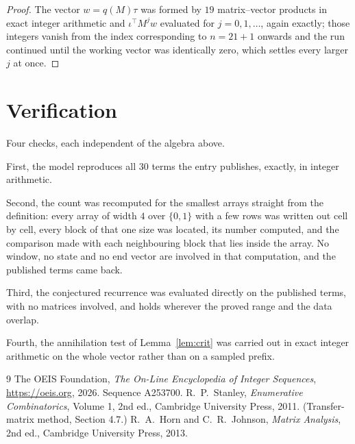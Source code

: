 \documentclass[11pt,a4paper]{article}
\theoremstyle{plain}
\theoremstyle{definition}
\begin{document}
\begin{proof}
The vector $w=q(M)\tau$ was formed by $19$ matrix--vector products in exact integer
arithmetic and $\iota^{\!\top}M^{j}w$ evaluated for $j=0,1,\dots$, again exactly; those
integers vanish from the index corresponding to $n=21+1$ onwards and the run continued
until the working vector was identically zero, which settles every larger $j$ at once.
\end{proof}

\section{Verification}

Four checks, each independent of the algebra above.

First, the model reproduces all $30$ terms the entry publishes, exactly, in integer
arithmetic.

Second, the count was recomputed for the smallest arrays straight from the definition: every
array of width $4$ over $\{0,1\}$ with a few rows was written out cell by cell, every block of
that one size was located, its number computed, and the comparison made with each neighbouring block
that lies inside the array. No window, no state and no end vector are involved in that
computation, and the published terms came back.

Third, the conjectured recurrence was evaluated directly on the published terms, with no
matrices involved, and holds wherever the proved range and the data overlap.

Fourth, the annihilation test of Lemma~\ref{lem:crit} was carried out in exact integer
arithmetic on the whole vector rather than on a sampled prefix.

\begin{thebibliography}{9}
 The OEIS Foundation, \emph{The On-Line Encyclopedia of Integer
Sequences}, \url{https://oeis.org}, 2026. Sequence A253700.
 R.~P.~Stanley, \emph{Enumerative Combinatorics}, Volume 1, 2nd ed.,
Cambridge University Press, 2011. (Transfer-matrix method, Section 4.7.)
 R.~A.~Horn and C.~R.~Johnson, \emph{Matrix Analysis}, 2nd ed., Cambridge
University Press, 2013.
\end{thebibliography}
\end{document}
